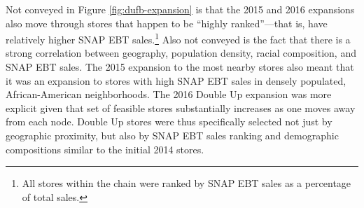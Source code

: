 \documentclass[12pt,letterpaperpaper,]{book}
\let\rmarkdownfootnote\footnote%
\def\footnote{\protect\rmarkdownfootnote}
\begin{document}
Not conveyed in Figure \ref{fig:dufb-expansion} is that the 2015 and
2016 expansions also move through stores that happen to be ``highly
ranked''---that is, have relatively higher SNAP EBT sales.\footnote{All
  stores within the chain were ranked by SNAP EBT sales as a percentage
  of total sales.} Also not conveyed is the fact that there is a strong
correlation between geography, population density, racial composition,
and SNAP EBT sales. The 2015 expansion to the most nearby stores also
meant that it was an expansion to stores with high SNAP EBT sales in
densely populated, African-American neighborhoods. The 2016 Double Up
expansion was more explicit given that set of feasible stores
substantially increases as one moves away from each node. Double Up
stores were thus specifically selected not just by geographic proximity,
but also by SNAP EBT sales ranking and demographic compositions similar
to the initial 2014 stores.
\end{document}
